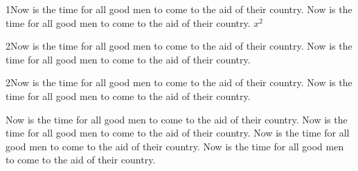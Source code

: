 \documentclass{article}
\begin{document}
1Now is the time for all good men to come to the aid of their country. Now%
is the time for all good men to come to the aid of their country. $x^2$ %

2Now is the time for all good men to come to the aid of their country. Now  %
is the time for all good men to come to the aid of their country.%

2Now is the time for all good men to come to the aid of their country. Now  %
is the time for all good men to come to the aid of their country. %

	Now is the time for all good men to come to the aid of their country. Now %
	is the time for all good men to come to the aid of their country. %
	Now is the time for all good men to come to the aid of their country. Now%
	is the time for all good men to come to the aid of their country.%
\end{document}
